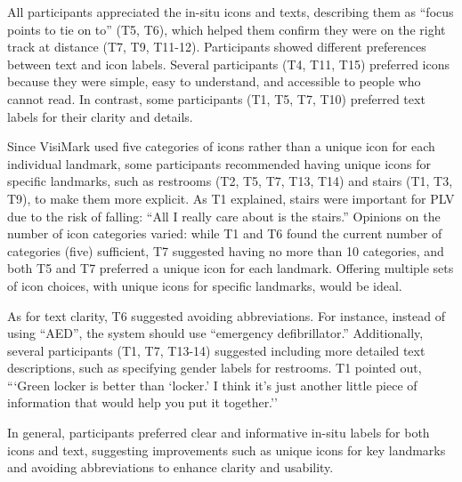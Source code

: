 All participants appreciated the in-situ icons and texts, describing them as ``focus points to tie on to'' (T5, T6), which helped them confirm they were on the right track at distance (T7, T9, T11-12). Participants showed different preferences between text and icon labels. Several participants (T4, T11, T15) preferred icons because they were simple, easy to understand, and accessible to people who cannot read. %
In contrast, some participants (T1, T5, T7, T10) preferred text labels for their clarity and details. 

Since VisiMark used five categories of icons rather than a unique icon for each individual landmark, some participants recommended having unique icons for specific landmarks, such as restrooms (T2, T5, T7, T13, T14) and stairs (T1, T3, T9), to make them more explicit. As T1 explained, stairs were important for PLV due to the risk of falling: ``All I really care about is the stairs.'' Opinions on the number of icon categories varied: while T1 and T6 found the current number of categories (five) sufficient, T7 suggested having no more than 10 categories, and both T5 and T7 preferred a unique icon for each landmark. Offering multiple sets of icon choices, with unique icons for specific landmarks, would be ideal.

As for text clarity, T6 suggested avoiding abbreviations. For instance, instead of using ``AED'', the system should use ``emergency defibrillator.'' Additionally, several participants (T1, T7, T13-14) suggested including more detailed text descriptions, such as specifying gender labels for restrooms. T1 pointed out, ```Green locker is better than `locker.' I think it's just another little piece of information that would help you put it together.'' 

In general, participants preferred clear and informative in-situ labels for both icons and text, suggesting improvements such as unique icons for key landmarks and avoiding abbreviations to enhance clarity and usability.



